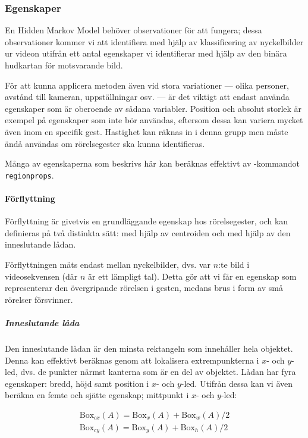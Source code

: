\documentclass[../rapport_MVEX01-11-05]{subfiles}
\begin{document}
\subsubsection{Egenskaper}
En Hidden Markov Model behöver observationer för att fungera; dessa
observationer kommer vi att identifiera med hjälp av klassificering av
nyckelbilder ur videon utifrån ett antal egenskaper vi identifierar
med hjälp av den binära hudkartan för motsvarande bild.

För att kunna applicera metoden även vid stora variationer --- olika
personer, avstånd till kameran, uppställningar osv. --- är det viktigt
att endast använda egenskaper som är oberoende av sådana variabler.
Position och absolut storlek är exempel på egenskaper som inte bör
användas, eftersom dessa kan variera mycket även inom en specifik
gest. Hastighet kan räknas in i denna grupp men måste ändå användas
om rörelsegester ska kunna identifieras.

Många av egenskaperna som beskrivs här kan beräknas effektivt av
\MATLAB-kommandot \texttt{regionprops}.

\paragraph{Förflyttning}
\label{feat:forflytt}

Förflyttning är givetvis en grundläggande egenskap hos rörelsegester,
och kan definieras på två distinkta sätt: med hjälp av centroiden och
med hjälp av den inneslutande lådan.

Förflyttningen mäts endast mellan
nyckelbilder, dvs. var $n$:te bild i videosekvensen (där $n$ är ett
lämpligt tal). Detta gör att vi får en egenskap som representerar den
övergripande rörelsen i gesten, medans brus i form av små rörelser
försvinner.

\subparagraph{Inneslutande låda}

Den inneslutande lådan är den minsta rektangeln som innehåller hela
objektet. Denna kan effektivt beräknas genom att lokalisera
extrempunkterna i $x$- och $y$-led, dvs. de punkter närmst kanterna
som är en del av objektet. Lådan har fyra egenskaper: bredd, höjd samt
position i $x$- och $y$-led. Utifrån dessa kan vi även beräkna en femte
och sjätte egenskap; mittpunkt i $x$- och $y$-led:

\begin{gather*}
  \textrm{Box}_{cx}(A) = \textrm{Box}_x(A) + \textrm{Box}_w(A)/2\\
  \textrm{Box}_{cy}(A) = \textrm{Box}_y(A) + \textrm{Box}_h(A)/2
\end{gather*}
\end{document}
